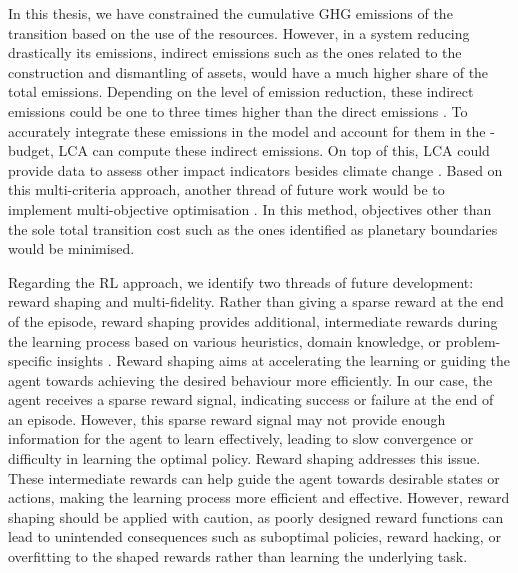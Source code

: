 In this thesis, we have constrained the cumulative \acrfull{GHG} emissions of the transition based on the use of the resources. However, in a system reducing drastically its emissions, indirect emissions such as the ones related to the construction and dismantling of assets, would have a much higher share of the total emissions. Depending on the level of emission reduction, these indirect emissions could be one to three times higher than the direct emissions \cite{blanco2020life}. To accurately integrate these emissions in the model and account for them in the -budget, \gls{LCA} can compute these indirect emissions. On top of this, \gls{LCA} could provide data to assess other impact indicators besides climate change \cite{astudillo2018integrating}. Based on this multi-criteria approach, another thread of future work would be to implement multi-objective optimisation \cite{dubois2023multi}. In this method, objectives other than the sole total transition cost such as the ones identified as planetary boundaries \cite{richardson2023earth} would be minimised.

Regarding the \gls{RL} approach, we identify two threads of future development: reward shaping and multi-fidelity.  Rather than giving a sparse reward at the end of the episode, reward shaping provides additional, intermediate rewards during the learning process based on various heuristics, domain knowledge, or problem-specific insights \cite{hu2020learning}. Reward shaping aims at accelerating the learning or guiding the agent towards achieving the desired behaviour more efficiently. In our case, the agent receives a sparse reward signal, indicating success or failure at the end of an episode. However, this sparse reward signal may not provide enough information for the agent to learn effectively, leading to slow convergence or difficulty in learning the optimal policy. Reward shaping addresses this issue. These intermediate rewards can help guide the agent towards desirable states or actions, making the learning process more efficient and effective. However, reward shaping should be applied with caution, as poorly designed reward functions can lead to unintended consequences such as suboptimal policies, reward hacking, or overfitting to the shaped rewards rather than learning the underlying task.  

